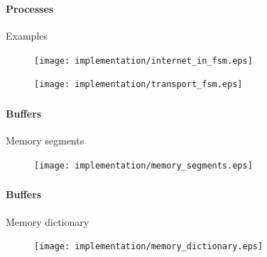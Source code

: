 
\begin{frame}[fragile]
    \frametitle{\ImplementationTitle}
    \framesubtitle{Processes}
    Examples\\
    \begin{minipage}[t]{0.5\textwidth}
        \begin{figure}
                \centering
                \texttt{[image: implementation/internet\_in\_fsm.eps]}
        \end{figure}
    \end{minipage}%
    \hfill%
    \begin{minipage}[t]{0.5\textwidth}
        \begin{figure}
                \centering
                \texttt{[image: implementation/transport\_fsm.eps]}
        \end{figure}
    \end{minipage}
\end{frame}

\begin{frame}[fragile]
    \frametitle{\ImplementationTitle}
    \framesubtitle{Buffers}
    Memory segments\\
    \begin{minipage}[t]{1\textwidth}
        \begin{figure}
                \centering
                \texttt{[image: implementation/memory\_segments.eps]}
        \end{figure}
    \end{minipage}
\end{frame}

\begin{frame}[fragile]
    \frametitle{\ImplementationTitle}
    \framesubtitle{Buffers}
    Memory dictionary\\
    \begin{minipage}[t]{1\textwidth}
        \begin{figure}
                \centering
                \texttt{[image: implementation/memory\_dictionary.eps]}
        \end{figure}
    \end{minipage}
\end{frame}

